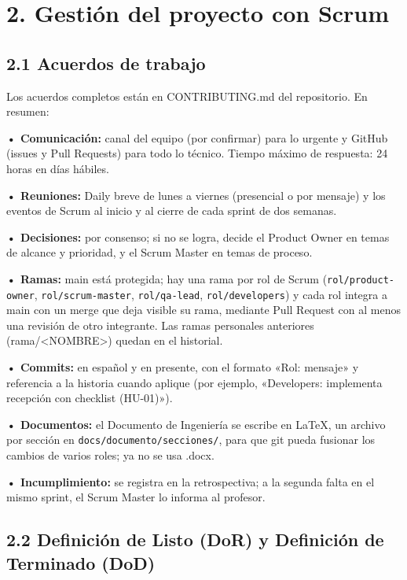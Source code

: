 \section{2. Gestión del proyecto con
Scrum}\label{gestiuxf3n-del-proyecto-con-scrum}

\subsection{2.1 Acuerdos de trabajo}\label{acuerdos-de-trabajo}

Los acuerdos completos están en CONTRIBUTING.md del repositorio. En
resumen:

\textbf{• Comunicación:} canal del equipo (por confirmar) para lo
urgente y GitHub (issues y Pull Requests) para todo lo técnico. Tiempo
máximo de respuesta: 24 horas en días hábiles.

\textbf{• Reuniones:} Daily breve de lunes a viernes (presencial o por
mensaje) y los eventos de Scrum al inicio y al cierre de cada sprint de
dos semanas.

\textbf{• Decisiones:} por consenso; si no se logra, decide el Product
Owner en temas de alcance y prioridad, y el Scrum Master en temas de
proceso.

\textbf{• Ramas:} main está protegida; hay una rama por rol de Scrum
(\texttt{rol/product-owner}, \texttt{rol/scrum-master}, \texttt{rol/qa-lead},
\texttt{rol/developers}) y cada rol integra a main con un merge que deja
visible su rama, mediante Pull Request con al menos una revisión de otro
integrante. Las ramas personales anteriores
(rama/\textless NOMBRE\textgreater) quedan en el historial.

\textbf{• Commits:} en español y en presente, con el formato
«Rol: mensaje» y referencia a la historia cuando aplique (por ejemplo,
«Developers: implementa recepción con checklist (HU-01)»).

\textbf{• Documentos:} el Documento de Ingeniería se escribe en LaTeX,
un archivo por sección en \texttt{docs/documento/secciones/}, para que
git pueda fusionar los cambios de varios roles; ya no se usa .docx.

\textbf{• Incumplimiento:} se registra en la retrospectiva; a la segunda
falta en el mismo sprint, el Scrum Master lo informa al profesor.

\subsection{2.2 Definición de Listo (DoR) y Definición de Terminado
(DoD)}\label{definiciuxf3n-de-listo-dor-y-definiciuxf3n-de-terminado-dod}

